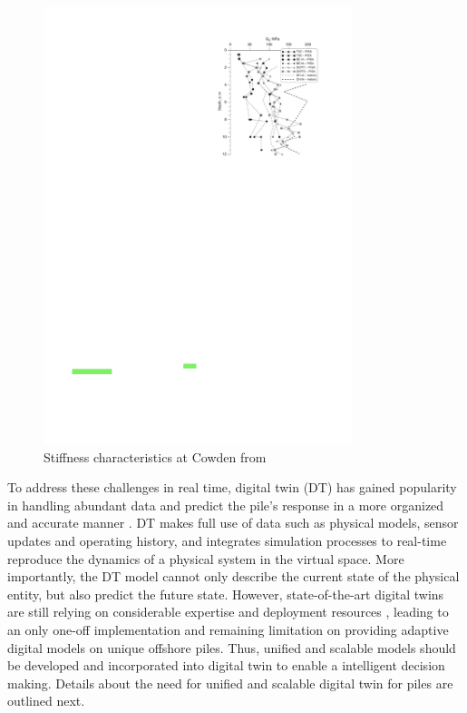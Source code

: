 \begin{figure}[H]
    \centering
    \includegraphics[width = 90mm]{Figures/figure-Cowden.pdf}
    \caption{Stiffness characteristics at Cowden from \protect\cite{zdravkovic2020}}
    \label{fig:fig-Cowden}
\end{figure}


To address these challenges in real time, digital twin (DT) has gained popularity in handling abundant data and predict the pile's response in a more organized and accurate manner \citep{wang2021}. DT makes full use of data such as physical models, sensor updates and operating history, and integrates simulation processes to real-time reproduce the dynamics of a physical system in the virtual space. More importantly, the DT model cannot only describe the current state of the physical entity, but also predict the future state. However, state-of-the-art digital twins are still relying on considerable expertise and deployment resources \citep{kapteyn2021}, leading to an only one-off implementation and remaining limitation on providing adaptive digital models on unique offshore piles. Thus, unified and scalable models should be developed and incorporated into digital twin to enable a intelligent decision making. Details about the need for unified and scalable digital twin for piles are outlined next.








